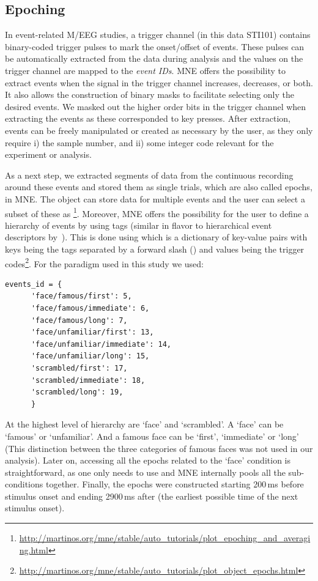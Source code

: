 \subsection{Epoching}
\label{sec:epoching}
In event-related M/EEG studies, a trigger channel (in this data STI101) contains binary-coded trigger pulses to mark the onset/offset of events. These pulses can be automatically extracted from the data during analysis and the values on the trigger channel are mapped to the \textit{event IDs}. MNE offers the possibility to extract events when the signal in the trigger channel increases, decreases, or both. It also allows the construction of binary masks to facilitate selecting only the desired events. We masked out the higher order bits in the trigger channel when extracting the events as these corresponded to key presses. After extraction, events can be freely manipulated or created as necessary by the user, as they only require i) the sample number, and ii) some integer code relevant for the experiment or analysis.

As a next step, we extracted segments of data from the continuous recording around these events and stored them as single trials, which are also called epochs, in MNE. The  object can store data for multiple events and the user can select a subset of these as \footnote{\url{http://martinos.org/mne/stable/auto_tutorials/plot_epoching_and_averaging.html}}. Moreover, MNE offers the possibility for the user to define a hierarchy of events by using tags (similar in flavor to hierarchical event descriptors by~\cite{bigdely2013hierarchical}). This is done using  which is a dictionary of key-value pairs with keys being the tags separated by a forward slash (\code{\//}) and values being the trigger codes\footnote{\url{http://martinos.org/mne/stable/auto_tutorials/plot_object_epochs.html}}. For the paradigm used in this study we used:
      \begin{lstlisting}[]
      events_id = {
      'face/famous/first': 5,
      'face/famous/immediate': 6,
      'face/famous/long': 7,
      'face/unfamiliar/first': 13,
      'face/unfamiliar/immediate': 14,
      'face/unfamiliar/long': 15,
      'scrambled/first': 17,
      'scrambled/immediate': 18,
      'scrambled/long': 19,
      }
      \end{lstlisting}
At the highest level of hierarchy are `face' and `scrambled'. A `face' can be `famous' or `unfamiliar'. And a famous face can be `first', `immediate' or `long' (This distinction between the three categories of famous faces was not used in our analysis). Later on, accessing all the epochs related to the `face' condition is straightforward, as one only needs to use  and MNE internally pools all the sub-conditions together.
Finally, the epochs were constructed starting 200\,ms before stimulus onset and ending 2900\,ms after (the earliest possible time of the next stimulus onset).


